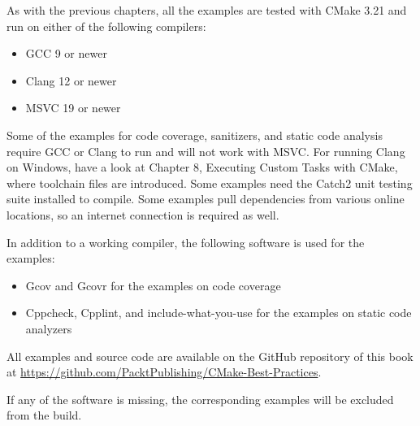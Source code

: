 As with the previous chapters, all the examples are tested with CMake 3.21 and run on either of the following compilers:

\begin{itemize}
\item 
GCC 9 or newer

\item 
Clang 12 or newer

\item 
MSVC 19 or newer
\end{itemize}

Some of the examples for code coverage, sanitizers, and static code analysis require
GCC or Clang to run and will not work with MSVC. For running Clang on Windows, have a look at Chapter 8, Executing Custom Tasks with CMake, where toolchain files are introduced. Some examples need the Catch2 unit testing suite installed to compile. Some examples pull dependencies from various online locations, so an internet connection is required as well. 

In addition to a working compiler, the following software is used for the examples:

\begin{itemize}
\item 
Gcov and Gcovr for the examples on code coverage
	
\item 
Cppcheck, Cpplint, and include-what-you-use for the examples on static code analyzers
\end{itemize}

All examples and source code are available on the GitHub repository of this book at \url{https://github.com/PacktPublishing/CMake-Best-Practices}. 

If any of the software is missing, the corresponding examples will be excluded from the build.






























